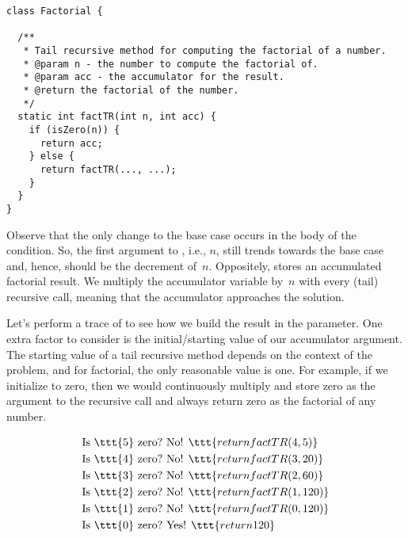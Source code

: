 \begin{lstlisting}[language=MyJava]
class Factorial {

  /**
   * Tail recursive method for computing the factorial of a number.
   * @param n - the number to compute the factorial of.
   * @param acc - the accumulator for the result.
   * @return the factorial of the number.
   */
  static int factTR(int n, int acc) {
    if (isZero(n)) {
      return acc;
    } else {
      return factTR(..., ...);
    }
  }
}
\end{lstlisting}

Observe that the only change to the base case occurs in the body of the condition. 
So, the first argument to , i.e., $n$, still trends towards the base case and, hence, should be the decrement of~$n$. 
Oppositely,  stores an accumulated factorial result. 
We multiply the accumulator variable by~$n$ with every (tail) recursive call, meaning that the accumulator approaches the solution.

Let's perform a trace of  to see how we build the result in the  parameter. 
One extra factor to consider is the initial/starting value of our accumulator argument. 
The starting value of a tail recursive method depends on the context of the problem, and for factorial, the only reasonable value is one. 
For example, if we initialize  to zero, then we would continuously multiply and store zero as the argument to the recursive call and always return zero as the factorial of any number.

\begin{align*}
    \text{Is }\ttt{5} \text{ zero?} &\text{ No! }\ttt{return factTR(4, 5)}\\
    \text{Is }\ttt{4} \text{ zero?} &\text{ No! }\ttt{return factTR(3, 20)}\\
    \text{Is }\ttt{3} \text{ zero?} &\text{ No! }\ttt{return factTR(2, 60)}\\
    \text{Is }\ttt{2} \text{ zero?} &\text{ No! }\ttt{return factTR(1, 120)}\\
    \text{Is }\ttt{1} \text{ zero?} &\text{ No! }\ttt{return factTR(0, 120)}\\
    \text{Is }\ttt{0} \text{ zero?} &\text{ Yes! }\ttt{return 120}
\end{align*}

